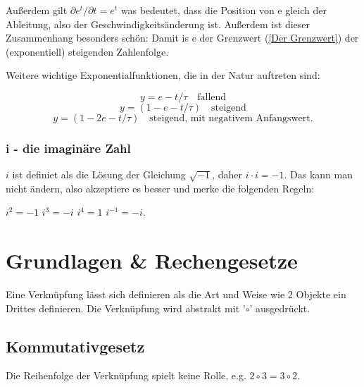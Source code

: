 \documentclass[letterpaper, titlepage]{article}
\begin{document}
\absatzformel
Außerdem gilt $\partial e^t/\partial t=e^t$ was bedeutet, dass die Position von e gleich der Ableitung, also der Geschwindigkeitsänderung ist. Außerdem ist dieser Zusammenhang  besonders schön: 
Damit is e der Grenzwert (\ref{Der Grenzwert}) der (exponentiell) steigenden Zahlenfolge.  

Weitere wichtige Exponentialfunktionen, die in der Natur auftreten sind:

$$y = e-t/\tau \quad \text{fallend}$$
$$y = (1 - e-t/\tau) \quad \text{steigend}$$
$$y = (1 - 2e-t/\tau) \quad \text{steigend, mit negativem Anfangswert.}$$

\vspace{0.35cm}

\subsubsection{i - die imaginäre Zahl}\label{i - die imaginäre Zahl}
$i$ ist definiet als die Lösung der Gleichung $\sqrt{-1}$, daher $i \cdot i = -1$. Das kann man nicht ändern, also akzeptiere es besser und merke die folgenden Regeln:
\begin{center}
    
    $i^2=-1$
    \skiptwolines
    $i^3=-i$
    \skiptwolines
    $i^4=1$
    \skiptwolines
    $i^{-1}=-i$.
    \newline
\end{center}

\vspace{0.35cm}

\section{Grundlagen \& Rechengesetze}\label{Grundlegende Rechengesetze}
Eine Verknüpfung lässt sich definieren als die Art und Weise wie 2 Objekte ein Drittes definieren. Die Verknüpfung wird abstrakt mit '$\circ$' ausgedrückt.

\vspace{0.7cm}

\subsection{Kommutativgesetz}\label{Kommutativgesetz}
Die Reihenfolge der Verknüpfung spielt keine Rolle, e.g. $2\circ 3=3 \circ 2$. 

\vspace{0.35cm}
\end{document}
